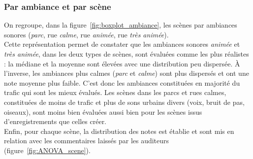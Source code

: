 \subsubsection{Par ambiance et par scène}

On regroupe, dans la figure~\ref{fig:boxplot_ambiance}, les scènes par ambiances sonores (\textit{parc}, rue \textit{calme}, rue \textit{animée}, rue \textit{très animée}).\\

%
%

 
Cette représentation permet de constater que les ambiances sonores \textit{animée} et \textit{très animée}, dans les deux types de scènes, sont évaluées comme les plus réalistes : la médiane et la moyenne sont élevées avec une distribution peu dispersée. \`A l'inverse, les ambiances plus calmes (\textit{parc} et \textit{calme}) sont plus dispersés et ont une note moyenne plus faible. C'est donc les ambiances constituées en majorité du trafic qui sont les mieux évalués. Les scènes dans les parcs et rues calmes, constituées de moins de trafic et plus de sons urbains divers (voix, bruit de pas, oiseaux), sont moins bien évaluées aussi bien pour les scènes issus d'enregistrements que celles créer.\\

Enfin, pour chaque scène, la distribution des notes est établie et sont mis en relation avec les commentaires laissés par les auditeurs (figure~\ref{fig:ANOVA_scene}).\\

%
%


